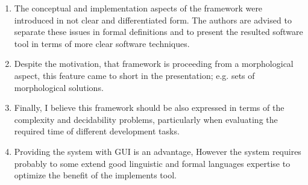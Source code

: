 \begin{enumerate}[leftmargin=0mm,label=\bfseries CommentR2.\arabic*]


\item \label{Review.2.1} 
The conceptual and implementation aspects of the framework 
were introduced in not clear and differentiated form. 
The authors are advised to separate these issues in formal 
definitions and to present the resulted software tool in 
terms of more clear software techniques.



\item \label{Review.2.2} 
Despite the motivation, that framework is proceeding from a 
morphological aspect, this feature came to short in the 
presentation; e.g. sets of morphological solutions.


\item \label{Review.2.3} 
Finally, I believe this framework should be also expressed 
in terms of the complexity and decidability problems, 
particularly when evaluating the required time of different 
development tasks. 
    
\item \label{Review.2.4} 
Providing the system with GUI is an advantage, 
However the system requires probably to some extend 
good linguistic and formal languages expertise to optimize 
the benefit of the implements tool.


\end{enumerate}
